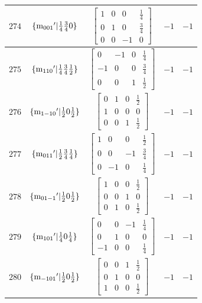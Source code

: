 \documentclass[fleqn,8pt]{jsarticle}
\begin{document}
\begin{longtable}{ccccc}
$ 274 $ & $ \{{\rm m}_{001}{}'|\frac{1}{4} \frac{3}{4} 0\} $ & $ \begin{bmatrix} 1 & 0 & 0 & \frac{1}{4} \\ 0 & 1 & 0 & \frac{3}{4} \\ 0 & 0 & -1 & 0 \end{bmatrix} $ & $ -1 $ & $ -1 $ \\ \hline
$ 275 $ & $ \{{\rm m}_{110}{}'|\frac{1}{4} \frac{3}{4} \frac{1}{2}\} $ & $ \begin{bmatrix} 0 & -1 & 0 & \frac{1}{4} \\ -1 & 0 & 0 & \frac{3}{4} \\ 0 & 0 & 1 & \frac{1}{2} \end{bmatrix} $ & $ -1 $ & $ -1 $ \\ \hline
$ 276 $ & $ \{{\rm m}_{1-10}{}'|\frac{1}{2} 0 \frac{1}{2}\} $ & $ \begin{bmatrix} 0 & 1 & 0 & \frac{1}{2} \\ 1 & 0 & 0 & 0 \\ 0 & 0 & 1 & \frac{1}{2} \end{bmatrix} $ & $ -1 $ & $ -1 $ \\ \hline
$ 277 $ & $ \{{\rm m}_{011}{}'|\frac{1}{2} \frac{3}{4} \frac{1}{4}\} $ & $ \begin{bmatrix} 1 & 0 & 0 & \frac{1}{2} \\ 0 & 0 & -1 & \frac{3}{4} \\ 0 & -1 & 0 & \frac{1}{4} \end{bmatrix} $ & $ -1 $ & $ -1 $ \\ \hline
$ 278 $ & $ \{{\rm m}_{01-1}{}'|\frac{1}{2} 0 \frac{1}{2}\} $ & $ \begin{bmatrix} 1 & 0 & 0 & \frac{1}{2} \\ 0 & 0 & 1 & 0 \\ 0 & 1 & 0 & \frac{1}{2} \end{bmatrix} $ & $ -1 $ & $ -1 $ \\ \hline
$ 279 $ & $ \{{\rm m}_{101}{}'|\frac{1}{4} 0 \frac{1}{4}\} $ & $ \begin{bmatrix} 0 & 0 & -1 & \frac{1}{4} \\ 0 & 1 & 0 & 0 \\ -1 & 0 & 0 & \frac{1}{4} \end{bmatrix} $ & $ -1 $ & $ -1 $ \\ \hline
$ 280 $ & $ \{{\rm m}_{-101}{}'|\frac{1}{2} 0 \frac{1}{2}\} $ & $ \begin{bmatrix} 0 & 0 & 1 & \frac{1}{2} \\ 0 & 1 & 0 & 0 \\ 1 & 0 & 0 & \frac{1}{2} \end{bmatrix} $ & $ -1 $ & $ -1 $ \\ \hline

\end{longtable}
\end{document}
